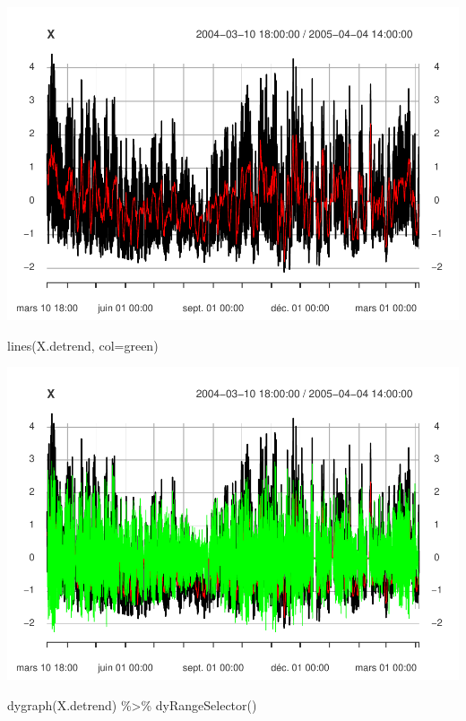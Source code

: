 \documentclass[
]{article}
\newenvironment{Shaded}{\begin{snugshade}}{\end{snugshade}}
\newcommand{\AttributeTok}[1]{\textcolor[rgb]{0.77,0.63,0.00}{#1}}
\newcommand{\FunctionTok}[1]{\textcolor[rgb]{0.00,0.00,0.00}{#1}}
\newcommand{\NormalTok}[1]{#1}
\newcommand{\SpecialCharTok}[1]{\textcolor[rgb]{0.00,0.00,0.00}{#1}}
\newcommand{\StringTok}[1]{\textcolor[rgb]{0.31,0.60,0.02}{#1}}
\begin{document}
\includegraphics{STA202_report_files/figure-latex/unnamed-chunk-11-7.pdf}

\begin{Shaded}
\begin{Highlighting}[]
\FunctionTok{lines}\NormalTok{(X.detrend, }\AttributeTok{col=}\StringTok{\textquotesingle{}green\textquotesingle{}}\NormalTok{)}
\end{Highlighting}
\end{Shaded}

\includegraphics{STA202_report_files/figure-latex/unnamed-chunk-11-8.pdf}

\begin{Shaded}
\begin{Highlighting}[]
\FunctionTok{dygraph}\NormalTok{(X.detrend) }\SpecialCharTok{\%\textgreater{}\%} \FunctionTok{dyRangeSelector}\NormalTok{()}
\end{Highlighting}
\end{Shaded}
\end{document}
